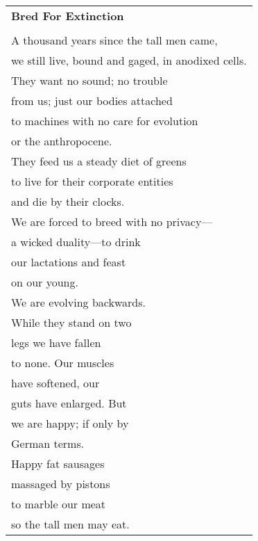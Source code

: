 \documentclass{article}
\begin{document}
\begin{center}
\begin{tabular}{l}
\textbf{Bred For Extinction} \\
\\
A thousand years since the tall men came, \\
we still live, bound and gaged, in anodixed cells. \\
They want no sound; no trouble \\
from us; just our bodies attached \\
to machines with no care for evolution \\
or the anthropocene. \\ %
They feed us a steady diet of greens \\
to live for their corporate entities \\
and die by their clocks. \\
We are forced to breed with no privacy--- \\
a wicked duality---to drink \\
our lactations and feast \\
on our young. \\
We are evolving backwards. \\
While they stand on two \\
legs we have fallen \\
to none.  Our muscles \\
have softened, our \\
guts have enlarged. But \\
we are happy; if only by \\
German terms. \\
Happy fat sausages \\
massaged by pistons \\
to marble our meat \\
so the tall men may eat. \\
\end{tabular}
\end{center}
\end{document}

